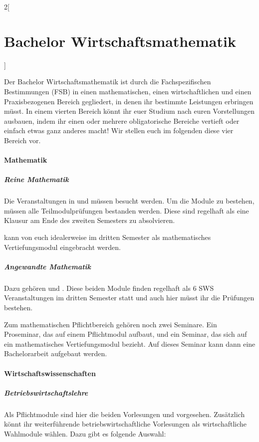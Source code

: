\begin{multicols}{2}[\section{Bachelor Wirtschaftsmathematik}]

Der Bachelor Wirtschaftsmathematik ist durch die Fachspezifischen Bestimmungen
(FSB) in einen mathematischen, einen wirtschaftlichen und einen Praxisbezogenen
Bereich gegliedert, in denen ihr bestimmte Leistungen erbringen müsst. In einem
vierten Bereich könnt ihr euer Studium nach euren Vorstellungen ausbauen, indem
ihr einen oder mehrere obligatorische Bereiche vertieft oder einfach etwas ganz
anderes macht! Wir stellen euch im folgenden diese vier Bereich vor.

\paragraph{Mathematik}

\subparagraph{Reine Mathematik}

Die Veranstaltungen in  und  müssen besucht werden. Um die Module zu
bestehen, müssen alle Teilmodulprüfungen bestanden werden. Diese sind regelhaft
als eine Klausur am Ende des zweiten Semesters zu absolvieren.

 kann von euch idealerweise im dritten Semester als
mathematisches Vertiefungsmodul eingebracht werden.

\subparagraph{Angewandte Mathematik}

Dazu gehören  und . Diese beiden Module finden regelhaft als 6 SWS Veranstaltungen im
dritten Semester statt und auch hier müsst ihr die Prüfungen bestehen.

Zum mathematischen Pflichtbereich gehören noch zwei Seminare. Ein Proseminar,
das auf einem Pflichtmodul aufbaut, und ein Seminar, das sich auf ein
mathematisches Vertiefungsmodul bezieht. Auf dieses Seminar kann dann eine
Bachelorarbeit aufgebaut werden.

\paragraph{Wirtschaftswissenschaften}

\subparagraph{Betriebswirtschaftslehre}

Als Pflichtmodule sind hier die beiden Vorlesungen  und
 vorgesehen.  Zusätzlich könnt ihr weiterführende
betriebswirtschaftliche Vorlesungen als wirtschaftliche Wahlmodule wählen. Dazu
gibt es folgende Auswahl:


\end{multicols}

